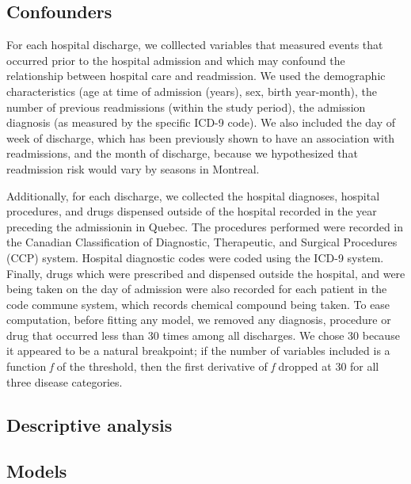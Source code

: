 \documentclass[]{article}
\begin{document}
\subsection{Confounders}
For each hospital discharge, we colllected variables that measured events that occurred prior to the hospital admission and which may confound the relationship between hospital care and readmission. We used the demographic characteristics (age at time of admission (years), sex, birth year-month), the number of previous readmissions (within the study period), the admission diagnosis (as measured by the specific ICD-9 code). We also included the day of week of discharge, which has been previously shown to have an association with readmissions, and the month of discharge, because we hypothesized that readmission risk would vary by seasons in Montreal.

Additionally, for each discharge, we collected the hospital diagnoses, hospital procedures, and drugs dispensed outside of the hospital recorded in the year preceding the admissionin in Quebec. The procedures performed were recorded in the Canadian Classification of Diagnostic, Therapeutic, and Surgical Procedures (CCP) system. Hospital diagnostic codes were coded using the ICD-9 system. Finally, drugs which were prescribed and dispensed outside the hospital, and were being taken on the day of admission were also recorded for each patient in the code commune system, which records chemical compound being taken. To ease computation, before fitting any model, we removed any diagnosis, procedure or drug that occurred less than 30 times among all discharges. We chose 30 because it appeared to be a natural breakpoint; if the number of variables included is a function \emph{f} of the threshold, then the first derivative of \emph{f} dropped at 30 for all three disease categories.


\subsection{Descriptive analysis}

\subsection{Models}
\end{document}
